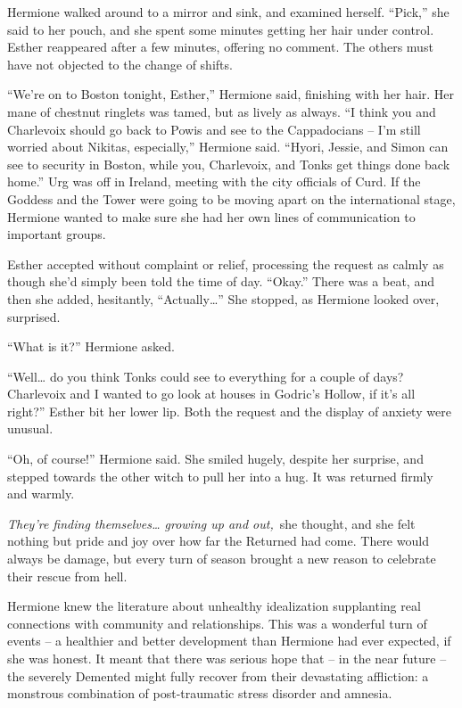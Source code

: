 Hermione walked around to a mirror and sink, and examined herself.
``Pick,'' she said to her pouch, and she spent some minutes getting her
hair under control. Esther reappeared after a few minutes, offering no
comment. The others must have not objected to the change of shifts.

``We're on to Boston tonight, Esther,'' Hermione said, finishing with
her hair. Her mane of chestnut ringlets was tamed, but as lively as
always. ``I think you and Charlevoix should go back to Powis and see to
the Cappadocians -- I'm still worried about Nikitas, especially,''
Hermione said. ``Hyori, Jessie, and Simon can see to security in Boston,
while you, Charlevoix, and Tonks get things done back home.'' Urg was
off in Ireland, meeting with the city officials of Curd. If the Goddess
and the Tower were going to be moving apart on the international stage,
Hermione wanted to make sure she had her own lines of communication to
important groups.

Esther accepted without complaint or relief, processing the request as
calmly as though she'd simply been told the time of day. ``Okay.'' There
was a beat, and then she added, hesitantly, ``Actually\ldots{}'' She
stopped, as Hermione looked over, surprised.

``What is it?'' Hermione asked.

``Well\ldots{} do you think Tonks could see to everything for a couple
of days? Charlevoix and I wanted to go look at houses in Godric's
Hollow, if it's all right?'' Esther bit her lower lip. Both the request
and the display of anxiety were unusual.

``Oh, of course!'' Hermione said. She smiled hugely, despite her
surprise, and stepped towards the other witch to pull her into a hug. It
was returned firmly and warmly.

\emph{They're finding themselves\ldots{} growing up and out,}~she
thought, and she felt nothing but pride and joy over how far the
Returned had come. There would always be damage, but every turn of
season brought a new reason to celebrate their rescue from hell.

Hermione knew the literature about unhealthy idealization supplanting
real connections with community and relationships. This was a wonderful
turn of events -- a healthier and better development than Hermione had
ever expected, if she was honest. It meant that there was serious hope
that -- in the near future -- the severely Demented might fully recover
from their devastating affliction: a monstrous combination of
post-traumatic stress disorder and amnesia.

